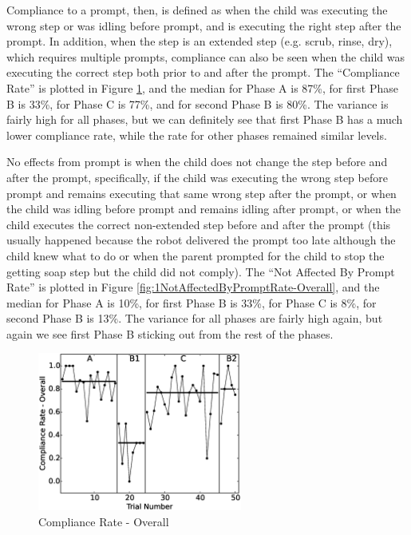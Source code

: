 Compliance to a prompt, then, is defined as when the child was executing the wrong step or was idling before prompt, and is executing the right step after the prompt.  In addition, when the step is an extended step (e.g. scrub, rinse, dry), which requires multiple prompts, compliance can also be seen when the child was executing the correct step both prior to and after the prompt.  The ``Compliance Rate'' is plotted in Figure \ref{fig:4ComplianceRate-Overall}, and the median for Phase A is 87\%, for first Phase B is 33\%, for Phase C is 77\%, and for second Phase B is 80\%.  The variance is fairly high for all phases, but we can definitely see that first Phase B has a much lower compliance rate, while the rate for other phases remained similar levels.

No effects from prompt is when the child does not change the step before and after the prompt, specifically, if the child was executing the wrong step before prompt and remains executing that same wrong step after the prompt, or when the child was idling before prompt and remains idling after prompt, or when the child executes the correct non-extended step before and after the prompt (this usually happened because the robot delivered the prompt too late although the child knew what to do or when the parent prompted for the child to stop the getting soap step but the child did not comply).  The ``Not Affected By Prompt Rate'' is plotted in Figure \ref{fig:1NotAffectedByPromptRate-Overall}, and the median for Phase A is 10\%, for first Phase B is 33\%, for Phase C is 8\%, for second Phase B is 13\%.  The variance for all phases are fairly high again, but again we see first Phase B sticking out from the rest of the phases.
\begin{figure} [h]
	\centering
	\includegraphics[width=0.6\textwidth]{./img/data_analysis/4ComplianceRate-Overall.eps}
	\caption{Compliance Rate - Overall}
	\label{fig:4ComplianceRate-Overall}
\end{figure}
